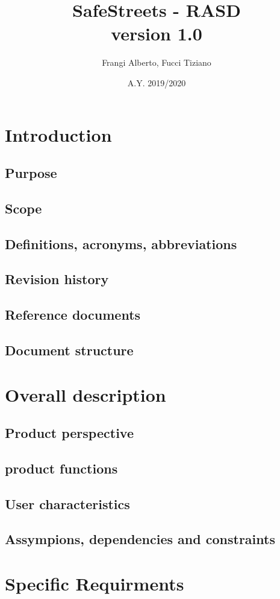 \documentclass[12pt,a4paper]{report}
\title{SafeStreets - RASD \\ \large version 1.0}
\author{Frangi Alberto, Fucci Tiziano}
\date{A.Y. 2019/2020}
\begin{document}
\maketitle
\chapter{Introduction}
	\section{Purpose}
	\section{Scope}
	\section{Definitions, acronyms, abbreviations}
	\section{Revision history}
	\section{Reference documents}
	\section{Document structure}

\chapter{Overall description}
	\section{Product perspective}
	\section{product functions}
	\section{User characteristics}
	\section{Assympions, dependencies and constraints}

\chapter{Specific Requirments}
\end{document}

